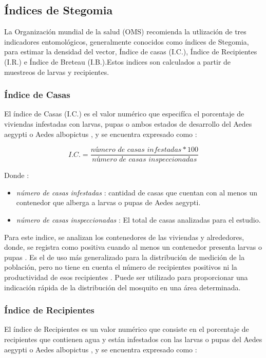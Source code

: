 
\subsection{Índices de Stegomia}
\label{sec:densidad-vectorial-indices-stegomia}
La Organización mundial de la salud (OMS) recomienda la utlización de tres indicadores
entomológicos, generalmente conocidos como índices de Stegomia, para estimar la densidad del
vector, Índice de casas (I.C.), Índice de Recipientes (I.R.) e Índice de Breteau (I.B.).Estos
indices son calculados a partir de muestreos de larvas y recipientes.

\subsubsection{Índice de Casas}
El índice de Casas (I.C.) es el valor numérico que especifíca el porcentaje de viviendas
infestadas con larvas, pupas o ambos estados de desarrollo del Aedes aegypti o Aedes albopictus
\cite{ibanez1995vectores, world2009dengue}, y se encuentra expresado como :

\begin{equation}
I.C. = \frac{\textit{número de casas infestadas} * 100}{\textit{número de casas inspeccionadas}}
\end{equation}

Donde :
\begin{itemize}
\item \textit{número de casas infestadas} : cantidad de casas que cuentan con al menos un contenedor que alberga a larvas o pupas de Aedes aegypti.
\item \textit{número de casas inspeccionadas} : El total de casas analizadas para el estudio.
\end{itemize}

Para este indice, se analizan los contenedores de las viviendas y alrededores, donde, se registra
como positiva cuando al menos un contenedor presenta larvas o pupas \cite{ibanez1995vectores}. Es
el de uso más generalizado para la distribución de medición de la población, pero no tiene en
cuenta el número de recipientes positivos ni la productividad de esos recipientes
\cite{world2009dengue}. Puede ser utilizado para proporcionar una indicación rápida de la
distribución del mosquito en una área determinada.

\subsubsection{Índice de Recipientes}
El índice de Recipientes es un valor numérico que consiste en el porcentaje de recipientes que
contienen agua y están infestados con las larvas o pupas del Aedes aegypti o Aedes albopictus
\cite{ibanez1995vectores, world2009dengue}, y se encuentra expresado como :

